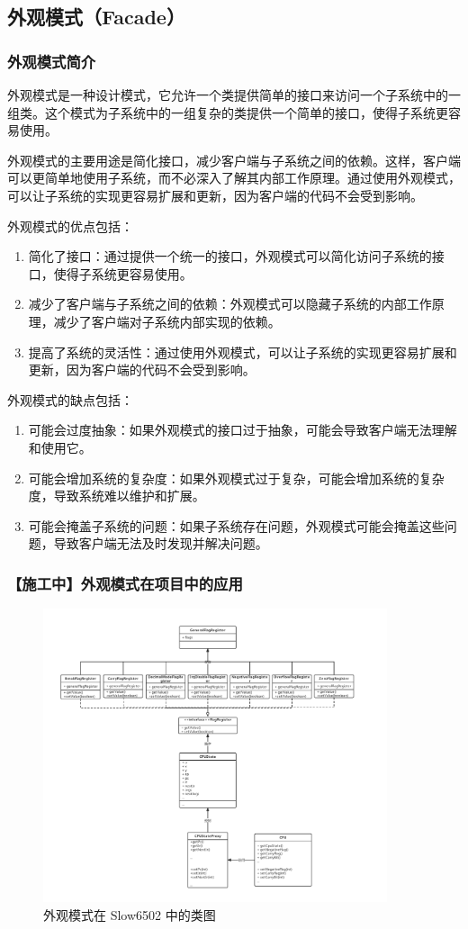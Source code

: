 \subsection{外观模式（Facade）}

\subsubsection{外观模式简介}

外观模式是一种设计模式，它允许一个类提供简单的接口来访问一个子系统中的一组类。这个模式为子系统中的一组复杂的类提供一个简单的接口，使得子系统更容易使用。

外观模式的主要用途是简化接口，减少客户端与子系统之间的依赖。这样，客户端可以更简单地使用子系统，而不必深入了解其内部工作原理。通过使用外观模式，可以让子系统的实现更容易扩展和更新，因为客户端的代码不会受到影响。

外观模式的优点包括：

\begin{enumerate}
    \item 简化了接口：通过提供一个统一的接口，外观模式可以简化访问子系统的接口，使得子系统更容易使用。
    \item 减少了客户端与子系统之间的依赖：外观模式可以隐藏子系统的内部工作原理，减少了客户端对子系统内部实现的依赖。
    \item 提高了系统的灵活性：通过使用外观模式，可以让子系统的实现更容易扩展和更新，因为客户端的代码不会受到影响。
\end{enumerate}

外观模式的缺点包括：

\begin{enumerate}
    \item 可能会过度抽象：如果外观模式的接口过于抽象，可能会导致客户端无法理解和使用它。
    \item 可能会增加系统的复杂度：如果外观模式过于复杂，可能会增加系统的复杂度，导致系统难以维护和扩展。
    \item 可能会掩盖子系统的问题：如果子系统存在问题，外观模式可能会掩盖这些问题，导致客户端无法及时发现并解决问题。
\end{enumerate}

\subsubsection{【施工中】外观模式在项目中的应用}

\begin{figure}[htb]
    \centering
    \includegraphics[width=0.9\textwidth]{figures/Facade.pdf}
    \caption{外观模式在 Slow6502 中的类图}
\end{figure}